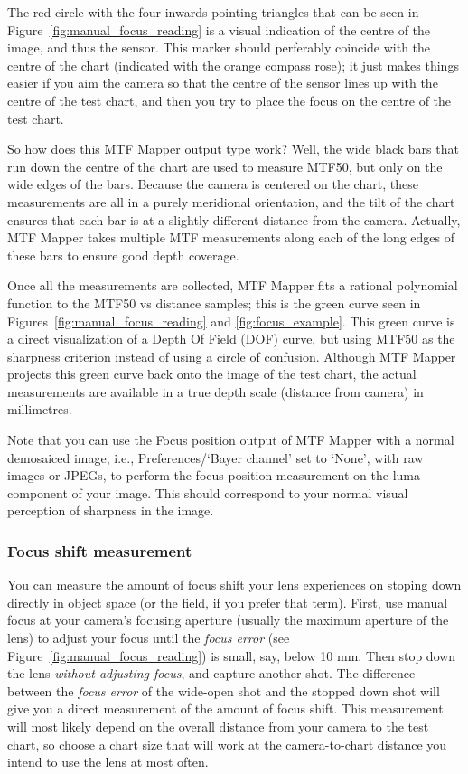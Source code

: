 \documentclass[a4paper]{article}
\begin{document}
The red circle with the four inwards-pointing triangles that can be seen in 
Figure~\ref{fig:manual_focus_reading} is a visual indication of the centre
of the image, and thus the sensor. This marker should  perferably coincide
with the centre of the chart (indicated with the orange compass rose); it
just makes things easier if you aim the camera so that the centre of the
sensor lines up with the centre of the test chart, and then you try to place
the focus on the centre of the test chart.

So how does this MTF Mapper output type work? Well, the wide black bars that
run down the centre of the chart are used to measure MTF50, but only on the
wide edges of the bars. Because the camera is centered on the chart, these
measurements are all in a purely meridional orientation, and the tilt of the
chart ensures that each bar is at a slightly different distance from the
camera. Actually, MTF Mapper takes multiple MTF measurements along each of
the long edges of these bars to ensure good depth coverage.

Once all the measurements are collected, MTF Mapper fits a rational
polynomial function to the MTF50 vs distance samples; this is the green
curve seen in Figures~\ref{fig:manual_focus_reading} and
\ref{fig:focus_example}. This green curve is a direct visualization of a
Depth Of Field (DOF) curve, but using MTF50 as the sharpness criterion instead 
of using a circle of confusion. Although MTF Mapper projects this
green curve back onto the image of the test chart, the actual measurements
are available in a true depth scale (distance from camera) in millimetres.

Note that you can use the \textsf{Focus position} output of MTF Mapper with
a normal demosaiced image, i.e., \textsf{Preferences}/`Bayer
channel' set to `None', with raw images or JPEGs, to perform the focus
position measurement on the luma component of your image. This should
correspond to your normal visual perception of sharpness in the image.

\subsubsection{Focus shift measurement}
You can measure the amount of focus shift your lens experiences on stoping
down directly in object space (or the field, if you prefer that term). 
First, use manual focus at your camera's focusing aperture (usually the
maximum aperture of the lens) to adjust your focus until the \emph{focus
error} (see Figure~\ref{fig:manual_focus_reading}) is small, say, below 10
mm.  Then stop down the lens \emph{without adjusting focus}, and capture
another shot.  The difference between the \emph{focus error} of the
wide-open shot and the stopped down shot will give you a direct measurement
of the amount of focus shift. This measurement will most likely depend on
the overall distance from your camera to the test chart, so choose a chart
size that will work at the camera-to-chart distance you intend to use the
lens at most often.
\end{document}
